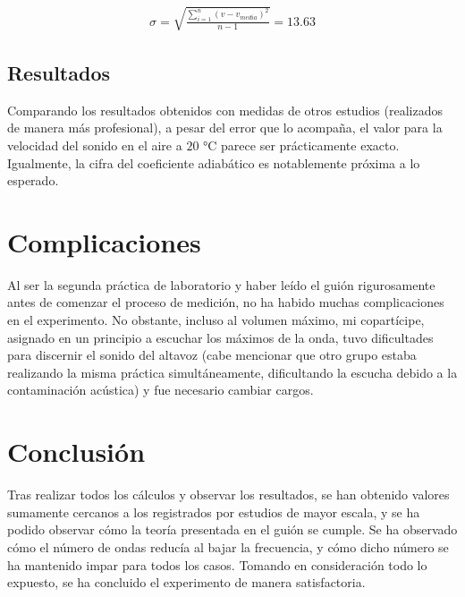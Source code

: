 \documentclass[fleqn,usenatbib,openbib]{mnras}
\begin{document}
\begin{gather}
    \sigma = \sqrt{\frac{\sum\limits_{i=1}^{n}(v-v_{media})^2}{n-1}} = \boxed{13.63}
\end{gather}

\pagebreak
\subsection{Resultados}

Comparando los resultados obtenidos con medidas de otros estudios (realizados de manera más profesional), a pesar del error que lo acompaña, el valor para la velocidad del sonido en el aire a $20$ °C parece ser prácticamente exacto. Igualmente, la cifra del coeficiente adiabático es notablemente próxima a lo esperado.



\section{Complicaciones}

Al ser la segunda práctica de laboratorio y haber leído el guión rigurosamente antes de comenzar el proceso de medición, no ha habido muchas complicaciones en el experimento. No obstante, incluso al volumen máximo, mi copartícipe, asignado en un principio a escuchar los máximos de la onda, tuvo dificultades para discernir el sonido del altavoz (cabe mencionar que otro grupo estaba realizando la misma práctica simultáneamente, dificultando la escucha debido a la contaminación acústica) y fue necesario cambiar cargos. 

\section{Conclusión}

Tras realizar todos los cálculos y observar los resultados, se han obtenido valores sumamente cercanos a los registrados por estudios de mayor escala, y se ha podido observar cómo la teoría presentada en el guión \cite{labuam} se cumple. Se ha observado cómo el número de ondas reducía al bajar la frecuencia, y cómo dicho número se ha mantenido impar para todos los casos. Tomando en consideración todo lo expuesto, se ha concluido el experimento de manera satisfactoria.

\end{document}
